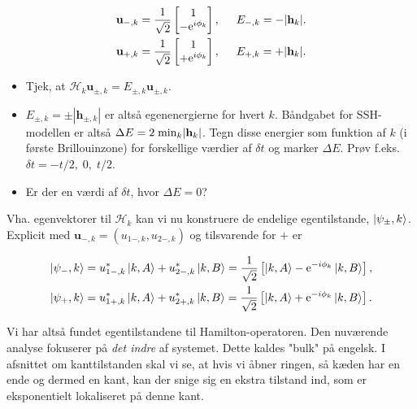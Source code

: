 \documentclass[11pt, a4paper]{article}
\def\te{{\rm e}}
\begin{document}
\begin{align}
\mathbf{u}_{-, k} &= \frac{1}{\sqrt{2}}\begin{bmatrix} 1 \\ -\te^{i\phi_k} \end{bmatrix}, \hspace{0.5cm} E_{-, k} = - |\mathbf{h}_k|. \nonumber \\
\mathbf{u}_{+, k} &= \frac{1}{\sqrt{2}}\begin{bmatrix} 1 \\ +\te^{i\phi_k} \end{bmatrix}, \hspace{0.5cm} E_{+, k} = + |\mathbf{h}_k|. \nonumber
\end{align}


\begin{itemize}
	\item Tjek, at $\mathcal{H}_k \mathbf{u}_{\pm, k} = E_{\pm, k} \mathbf{u}_{\pm, k}$. 

	\item $E_{\pm, k} = \pm |\mathbf{h}_{\pm, k}|$ er altså egenenergierne for hvert $k$. Båndgabet for SSH-modellen er altså $\Delta E = 2\; {\rm min}_k |\mathbf{h}_k|$. Tegn disse energier som funktion af $k$ (i første Brillouinzone) for forskellige værdier af $\delta t$ og marker $\Delta E$. Prøv f.eks. $\delta t = - t / 2, \; 0, \; t / 2$. 

	\item Er der en værdi af $\delta t$, hvor $\Delta E = 0$? 
\end{itemize}

Vha. egenvektorer til $\mathcal{H}_k$ kan vi nu konstruere de endelige egentilstande, $\ket{\psi_{\pm}, k}$. Explicit med $\mathbf{u}_{-, k} = (u_{1-, k}, u_{2-, k})$ og tilsvarende for $+$ er

\begin{align}
	\ket{\psi_-, k} &= u_{1-, k}^* \ket{k, A} + u_{2-, k}^* \ket{k, B} = \frac{1}{\sqrt{2}}\left[\ket{k, A} - \te^{-i \phi_k}\ket{k, B} \right], \nonumber \\
	\ket{\psi_+, k} &= u_{1+, k}^* \ket{k, A} + u_{2+, k}^* \ket{k, B} = \frac{1}{\sqrt{2}}\left[\ket{k, A} + \te^{-i \phi_k}\ket{k, B} \right].
	\label{eq.eigenstates}
\end{align}

Vi har altså fundet egentilstandene til Hamilton-operatoren. Den nuværende analyse fokuserer på \textit{det indre} af systemet. Dette kaldes "bulk" på engelsk. I afsnittet om kanttilstanden skal vi se, at hvis vi åbner ringen, så kæden har en ende og dermed en kant, kan der snige sig en ekstra tilstand ind, som er eksponentielt lokaliseret på denne kant.   
\end{document}

